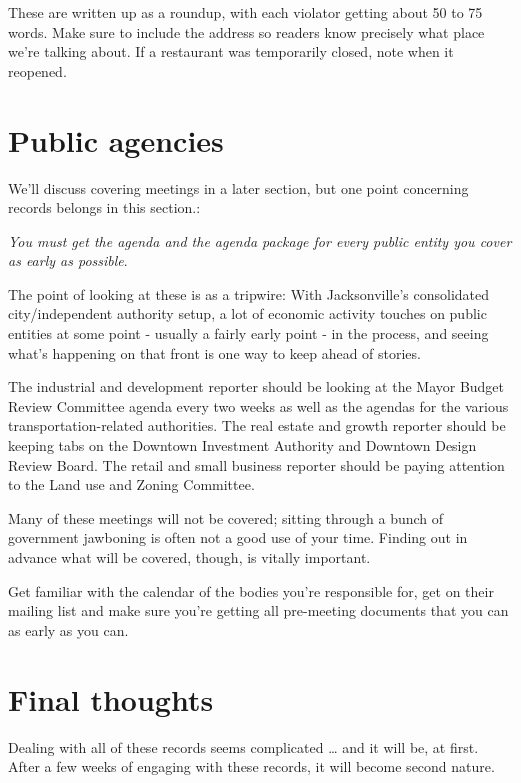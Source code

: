 \documentclass[
  11pt,
  american,
  letterpaperpaper,
  extrafontsizes,onecolumn,openright
  ]{memoir}
\begin{document}
These are written up as a roundup, with each violator getting about 50 to 75 words. Make sure to include the address so readers know precisely what place we're talking about. If a restaurant was temporarily closed, note when it reopened.

\hypertarget{public-agencies}{%
\section*{Public agencies}\label{public-agencies}}

We'll discuss covering meetings in a later section, but one point concerning records belongs in this section.:

\emph{You must get the agenda \emph{and the agenda package} for every public entity you cover as early as possible}.

The point of looking at these is as a tripwire: With Jacksonville's consolidated city/independent authority setup, a lot of economic activity touches on public entities at some point - usually a fairly early point - in the process, and seeing what's happening on that front is one way to keep ahead of stories.

The industrial and development reporter should be looking at the Mayor Budget Review Committee agenda every two weeks as well as the agendas for the various transportation-related authorities. The real estate and growth reporter should be keeping tabs on the Downtown Investment Authority and Downtown Design Review Board. The retail and small business reporter should be paying attention to the Land use and Zoning Committee.

Many of these meetings will not be covered; sitting through a bunch of government jawboning is often not a good use of your time. Finding out in advance what will be covered, though, is vitally important.

Get familiar with the calendar of the bodies you're responsible for, get on their mailing list and make sure you're getting all pre-meeting documents that you can as early as you can.

\hypertarget{final-thoughts-2}{%
\section*{Final thoughts}\label{final-thoughts-2}}

Dealing with all of these records seems complicated \ldots{} and it will be, at first. After a few weeks of engaging with these records, it will become second nature.
\end{document}
